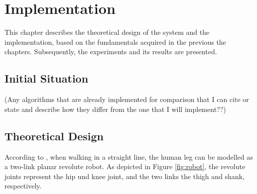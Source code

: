 \chapter{Implementation}
\label{ch:Implementation}

This chapter describes the theoretical design of the system and the implementation, based on the fundamentals acquired in the previous the chapters. Subsequently, the experiments and its results are presented.

\section{Initial Situation}

 (Any algorithms that are already implemented for comparison that I can cite or state and describe how they differ from the one that I will implement??)

\section{Theoretical Design}

According to \citeauthor{bennett_motion_2014} \cite{bennett_motion_2014}, when walking in a straight line, the human leg can be modelled as a two-link planar revolute robot. As depicted in Figure \ref{fig:robot}, the revolute joints represent the hip und knee joint, and the two links the thigh and shank, respectively.

